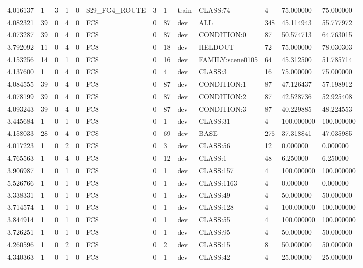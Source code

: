 \begin{tabular}{lllllllllllll}
4.016137 & 1 & 3 & 1 & 0 & S29\_FG4\_ROUTE & 3 & 1 & train & CLASS:74 & 4 & 75.000000 & 75.000000 \\
4.082321 & 39 & 0 & 4 & 0 & FC8 & 0 & 87 & dev & ALL & 348 & 45.114943 & 55.777972 \\
4.073287 & 39 & 0 & 4 & 0 & FC8 & 0 & 87 & dev & CONDITION:0 & 87 & 50.574713 & 64.763015 \\
3.792092 & 11 & 0 & 4 & 0 & FC8 & 0 & 18 & dev & HELDOUT & 72 & 75.000000 & 78.030303 \\
4.153256 & 14 & 0 & 1 & 0 & FC8 & 0 & 16 & dev & FAMILY:scene0105 & 64 & 45.312500 & 51.785714 \\
4.137600 & 1 & 0 & 4 & 0 & FC8 & 0 & 4 & dev & CLASS:3 & 16 & 75.000000 & 75.000000 \\
4.084555 & 39 & 0 & 4 & 0 & FC8 & 0 & 87 & dev & CONDITION:1 & 87 & 47.126437 & 57.198912 \\
4.078199 & 39 & 0 & 4 & 0 & FC8 & 0 & 87 & dev & CONDITION:2 & 87 & 42.528736 & 52.925408 \\
4.093243 & 39 & 0 & 4 & 0 & FC8 & 0 & 87 & dev & CONDITION:3 & 87 & 40.229885 & 48.224553 \\
3.445684 & 1 & 0 & 1 & 0 & FC8 & 0 & 1 & dev & CLASS:31 & 4 & 100.000000 & 100.000000 \\
4.158033 & 28 & 0 & 4 & 0 & FC8 & 0 & 69 & dev & BASE & 276 & 37.318841 & 47.035985 \\
4.017223 & 1 & 0 & 2 & 0 & FC8 & 0 & 3 & dev & CLASS:56 & 12 & 0.000000 & 0.000000 \\
4.765563 & 1 & 0 & 4 & 0 & FC8 & 0 & 12 & dev & CLASS:1 & 48 & 6.250000 & 6.250000 \\
3.906987 & 1 & 0 & 1 & 0 & FC8 & 0 & 1 & dev & CLASS:157 & 4 & 100.000000 & 100.000000 \\
5.526766 & 1 & 0 & 1 & 0 & FC8 & 0 & 1 & dev & CLASS:1163 & 4 & 0.000000 & 0.000000 \\
3.338331 & 1 & 0 & 1 & 0 & FC8 & 0 & 1 & dev & CLASS:49 & 4 & 50.000000 & 50.000000 \\
3.714574 & 1 & 0 & 1 & 0 & FC8 & 0 & 1 & dev & CLASS:128 & 4 & 100.000000 & 100.000000 \\
3.844914 & 1 & 0 & 1 & 0 & FC8 & 0 & 1 & dev & CLASS:55 & 4 & 100.000000 & 100.000000 \\
3.726251 & 1 & 0 & 1 & 0 & FC8 & 0 & 1 & dev & CLASS:95 & 4 & 50.000000 & 50.000000 \\
4.260596 & 1 & 0 & 2 & 0 & FC8 & 0 & 2 & dev & CLASS:15 & 8 & 50.000000 & 50.000000 \\
4.340363 & 1 & 0 & 1 & 0 & FC8 & 0 & 1 & dev & CLASS:42 & 4 & 25.000000 & 25.000000 \\

\end{tabular}

